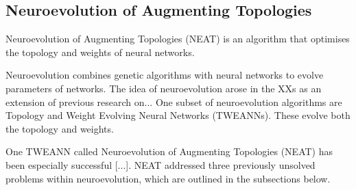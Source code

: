 \newpage

\subsection{Neuroevolution of Augmenting Topologies}
Neuroevolution of Augmenting Topologies (NEAT) is an algorithm that optimises the topology and weights of neural networks.


Neuroevolution combines genetic algorithms with neural networks to evolve parameters of networks. The idea of 
neuroevolution arose in the XXs as an extension of previous research on...
One subset of neuroevolution algorithms are Topology and Weight Evolving Neural Networks (TWEANNs). These
evolve both the topology and weights.

One TWEANN called Neuroevolution of Augmenting Topologies (NEAT) has been especially successful [...].
NEAT addressed three previously unsolved problems within neuroevolution, which are outlined in the subsections below.

